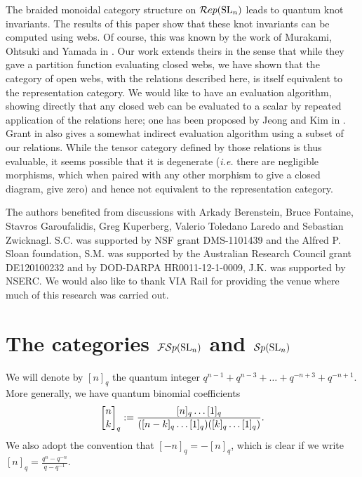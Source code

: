 \documentclass[11pt]{amsart}
\begin{document}
The braided monoidal category structure on $\mathcal{R}ep({\rm{SL}}_n) $ leads to quantum knot invariants.  The results of this paper show that these knot invariants can be computed using webs. Of course, this was known by the work of Murakami, Ohtsuki and Yamada in \cite{MR1659228}. Our work extends theirs in the sense that while they gave a partition function evaluating closed webs, we have shown that the category of open webs, with the relations described here, is itself equivalent to the representation category. We would like to have an evaluation algorithm, showing directly that any closed web can be evaluated to a scalar by repeated application of the relations here; one has been proposed by Jeong and Kim in \cite{math/0506403}. Grant in \cite{1212.4511} also gives a somewhat indirect evaluation algorithm using a subset of our relations. While the tensor category defined by those relations is thus evaluable, it seems possible that it is degenerate (\emph{i.e.} there are negligible morphisms, which when paired with any other morphism to give a closed diagram, give zero) and hence not equivalent to the representation category. 

\vspace{.5cm}

The authors benefited from discussions with Arkady Berenstein, Bruce Fontaine, Stavros Garoufalidis, Greg Kuperberg, Valerio Toledano Laredo and Sebastian Zwicknagl. S.C. was supported by NSF grant DMS-1101439 and the Alfred P. Sloan foundation, S.M. was supported by the Australian Research Council grant DE120100232 and by DOD-DARPA HR0011-12-1-0009, J.K. was supported by NSERC.  We would also like to thank VIA Rail for providing the venue where much of this research was carried out.

\section{The categories \texorpdfstring{${\mathcal{FS}p}({\rm{SL}}_n)$}{FSp(SL\_n)} and \texorpdfstring{${\mathcal{S}p}({\rm{SL}}_n)$}{Sp(SL\_n)}}\label{sec:diagrams}

We will denote by $[n]_q$ the quantum integer $q^{n-1} + q^{n-3} + \dots + q^{-n+3} + q^{-n+1}$. More generally, we have quantum binomial coefficients
$$\qBinomial{n}{k} := \frac{[n]_q\dots[1]_q}{([n-k]_q \dots [1]_q)([k]_q \dots [1]_q)}.$$
We also adopt the convention that $[-n]_q = -[n]_q$, which is clear if we write $[n]_q = \frac{q^{n} - q^{-n}}{q-q^{-1}}$.
\end{document}
